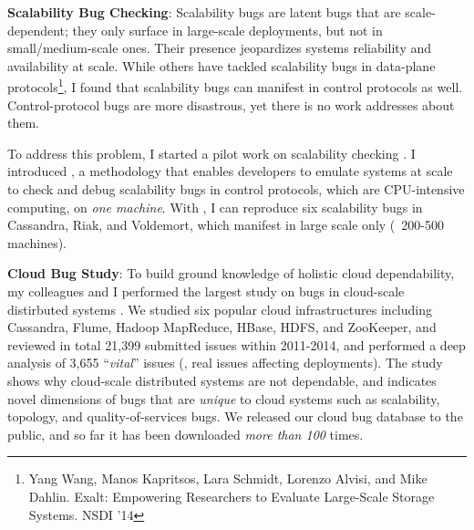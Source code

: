 \documentclass[10pt]{article}
\begin{document}
\noindent
\textbf{Scalability Bug Checking}: Scalability bugs are latent bugs that are
scale-dependent; they only surface in large-scale deployments, but not in
small/medium-scale ones. Their presence jeopardizes systems reliability and
availability at scale. 
%
While others have tackled scalability bugs in data-plane protocols\footnote{Yang
Wang, Manos Kapritsos, Lara Schmidt, Lorenzo Alvisi, and Mike Dahlin.
Exalt: Empowering Researchers to Evaluate Large-Scale Storage Systems. NSDI
'14}, I found that scalability bugs can manifest in control protocols as well.
Control-protocol bugs are more disastrous, yet there is no work addresses about
them.
 
To address this problem, I started a pilot work on scalability checking
\cite{Gunawi+17-SCk-Insub,Leesatapornwongsa+17-SCk-InPrep}. I introduced \sck, a
methodology that enables developers to emulate systems at scale to check and
debug scalability bugs in control protocols, which are CPU-intensive computing,
on \textit{one machine}. 
%
With \sck, I can reproduce six scalability bugs in Cassandra, Riak, and
Voldemort, which manifest in large scale only (\eg\ 200-500 machines). 


\noindent
\textbf{Cloud Bug Study}: To build ground knowledge of holistic cloud
dependability, my colleagues and I performed the largest study on bugs in
cloud-scale distirbuted systems \cite{Gunawi+14-Cbs}. We studied six popular
cloud infrastructures including Cassandra, Flume, Hadoop MapReduce, HBase, HDFS,
and ZooKeeper, and reviewed in total 21,399 submitted issues within 2011-2014,
and performed a deep analysis of 3,655 ``\textit{vital}'' issues (\ie, real
issues affecting deployments). The study shows why cloud-scale distributed
systems are not dependable, and indicates novel dimensions of bugs that are
\textit{unique} to cloud systems such as scalability, topology, and
quality-of-services bugs. We released our cloud bug database to the public, and
so far it has been downloaded \textit{more than 100} times.


\end{document}
